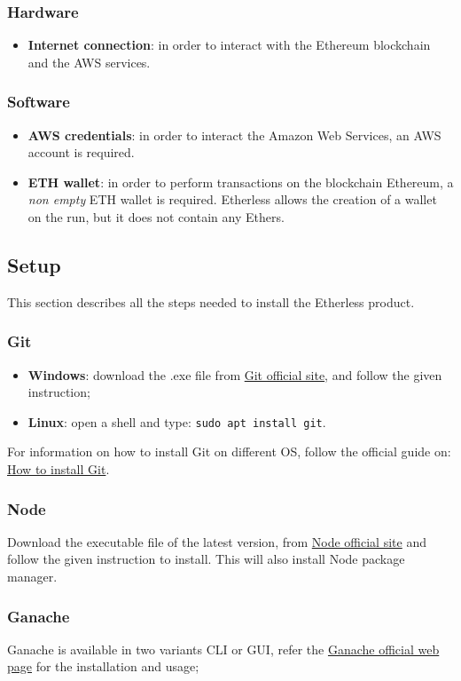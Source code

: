 \subsubsection{Hardware}
\begin{itemize}
	\item \textbf{Internet connection}: in order to interact with the Ethereum blockchain and the AWS services.
\end{itemize}
\subsubsection{Software}
\begin{itemize}
	\item \textbf{AWS credentials}: in order to interact the Amazon Web Services, an AWS account is required.
	\item \textbf{ETH wallet}: in order to perform transactions on the blockchain Ethereum, a \textit{non empty} ETH wallet is required. Etherless allows the creation of a wallet on the run, but it does not contain any Ethers.
\end{itemize}
\subsection{Setup}
This section describes all the steps needed to install the Etherless product.
\subsubsection{Git}
\begin{itemize}
	\item \textbf{Windows}: download the .exe file from \href{https://git-scm.com/download/win}{Git official site}, and follow the given instruction;
	\item \textbf{Linux}: open a shell and type: \texttt{sudo apt install git}.
\end{itemize}
	For information on how to install Git on different OS, follow the official guide on: \href{https://git-scm.com/book/en/v2/Getting-Started-Installing-Git}{How to install Git}.
\subsubsection{Node}
	Download the executable file of the latest version, from \href{https://nodejs.org/it/download/}{Node official site} and follow the given instruction to install. This will also install Node package manager.
\subsubsection{Ganache}
	Ganache is available in two variants CLI or GUI, refer the \href{https://www.trufflesuite.com/docs/ganache/quickstart}{Ganache official web page} for the installation and usage;
